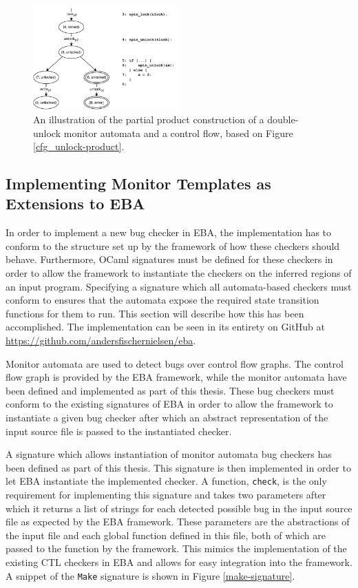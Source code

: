 \begin{figure}[H]
    \centering
    \includegraphics[width=0.5\textwidth]{implementation/figures/cfg_unlock-product-partial}
    \caption{An illustration of the partial product construction of a double-unlock monitor automata and a control flow, based on Figure \ref{cfg_unlock-product}.}
    \label{cfg_unlock-product-partial}
\end{figure}

\subsection{Implementing Monitor Templates as Extensions to EBA}
\label{integration-into-eba}

\noindent In order to implement a new bug checker in EBA, the implementation has to conform to the structure set up by the framework of how these checkers should behave. Furthermore, OCaml signatures must be defined for these checkers in order to allow the framework to instantiate the checkers on the inferred regions of an input program. Specifying a signature which all automata-based checkers must conform to ensures that the automata expose the required state transition functions for them to run. This section will describe how this has been accomplished. The implementation can be seen in its entirety on GitHub at \url{https://github.com/andersfischernielsen/eba}. 

\newpar Monitor automata are used to detect bugs over control flow graphs. The control flow graph is provided by the EBA framework, while the monitor automata have been defined and implemented as part of this thesis. These bug checkers must conform to the existing signatures of EBA in order to allow the framework to instantiate a given bug checker after which an abstract representation of the input source file is passed to the instantiated checker. 

\newpar A signature which allows instantiation of monitor automata bug checkers has been defined as part of this thesis. This signature is then implemented in order to let EBA instantiate the implemented checker. A function, \texttt{check}, is the only requirement for implementing this signature and takes two parameters after which it returns a list of strings for each detected possible bug in the input source file as expected by the EBA framework. These parameters are the abstractions of the input file and each global function defined in this file, both of which are passed to the function by the framework. This mimics the implementation of the existing CTL checkers in EBA and allows for easy integration into the framework. A snippet of the \texttt{Make} signature is shown in Figure \ref{make-signature}.


